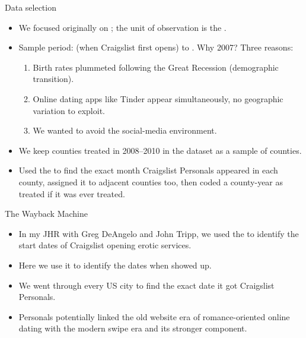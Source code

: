 \documentclass[aspectratio=169,11pt]{beamer}
\begin{document}
\begin{frame}{Data selection}
\vspace{0.3em}
\begin{itemize}\small\setlength\itemsep{0.4em}
  \item We focused originally on ; the unit of observation is the .
  \item Sample period:  (when Craigslist first opens) to . Why 2007? Three reasons:
  \begin{enumerate}\small\setlength\itemsep{0.15em}
    \item Birth rates plummeted following the Great Recession (demographic transition).
    \item Online dating apps like Tinder appear simultaneously, no geographic variation to exploit.
    \item We wanted to avoid the social-media environment.
  \end{enumerate}
  \item We keep counties treated in 2008--2010 in the dataset as a sample of  counties.
  \item Used the  to find the exact month Craigslist Personals appeared in each county, assigned it to adjacent counties too, then coded a county-year as treated if it was ever treated.
\end{itemize}
\end{frame}

\begin{frame}{The Wayback Machine}
\vspace{0.5em}
\begin{itemize}\setlength\itemsep{0.7em}
  \item In my JHR with Greg DeAngelo and John Tripp, we used the  to identify the start dates of Craigslist opening erotic services.
  \item Here we use it to identify the dates when  showed up.
  \item We went through every US city to find the exact date it got Craigslist Personals.
  \item Personals potentially linked the old website era of romance-oriented online dating with the modern swipe era and its stronger  component.
\end{itemize}
\vspace{0.4em}
\end{frame}
\end{document}
